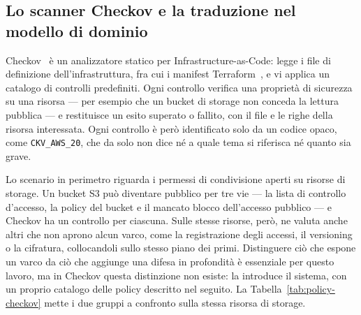 \subsection{Lo scanner Checkov e la traduzione nel modello di dominio}
\label{sec:checkov}

Checkov~\cite{checkov2026docs} è un analizzatore statico per
Infrastructure-as-Code: legge i file di definizione dell'infrastruttura, fra
cui i manifest Terraform~\cite{terraform2026docs}, e vi applica un catalogo di
controlli predefiniti. Ogni controllo verifica una proprietà di sicurezza su
una risorsa --- per esempio che un bucket di storage non conceda la lettura
pubblica --- e restituisce un esito superato o fallito, con il file e le righe
della risorsa interessata. Ogni controllo è però identificato solo da un codice
opaco, come \texttt{CKV\_AWS\_20}, che da solo non dice né a quale tema si
riferisca né quanto sia grave.

Lo scenario in perimetro riguarda i permessi di condivisione aperti su risorse
di storage. Un bucket S3 può diventare pubblico per tre vie --- la lista di
controllo d'accesso, la policy del bucket e il mancato blocco dell'accesso
pubblico --- e Checkov ha un controllo per ciascuna. Sulle stesse risorse,
però, ne valuta anche altri che non aprono alcun varco, come la registrazione
degli accessi, il versioning o la cifratura, collocandoli sullo stesso piano
dei primi. Distinguere ciò che espone un varco da ciò che aggiunge una difesa
in profondità è essenziale per questo lavoro, ma in Checkov questa distinzione
non esiste: la introduce il sistema, con un proprio catalogo delle policy
descritto nel seguito. La Tabella~\ref{tab:policy-checkov} mette i due gruppi a
confronto sulla stessa risorsa di storage.

